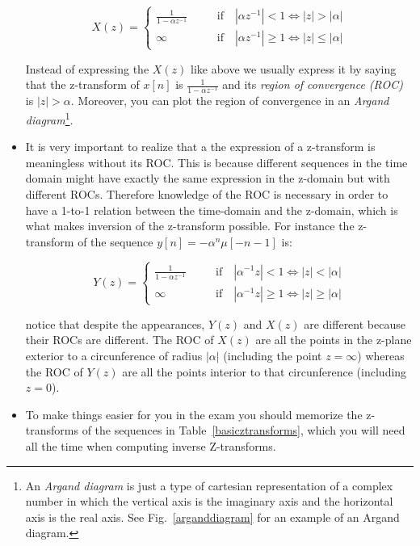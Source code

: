 \documentclass[a4paper,11pt,oneside]{article}
\begin{document}
\begin{itemize}
\begin{equation}
X(z)=\left\{
\begin{array}{lll}
\frac{1}{1-\alpha z^{-1}} &\quad & \textrm{if} \quad |\alpha z^{-1}|<1 \Leftrightarrow |z|> |\alpha|\\
\infty &\quad& \textrm{if} \quad |\alpha z^{-1}|\geq 1  \Leftrightarrow |z|\leq |\alpha|
\end{array}
\right.
\end{equation}

Instead of expressing the $X(z)$ like above we usually express it by saying that the z-transform of $x[n]$ is $\frac{1}{1-\alpha z^{-1}}$ and its \emph{region of convergence (ROC)} is $|z|>\alpha$. Moreover, you can plot the region of convergence in an \emph{Argand diagram}\footnote{An \emph{Argand diagram} is just a type of cartesian representation of a complex number in which the vertical axis is the imaginary axis and the horizontal axis is the real axis. See Fig.~\ref{arganddiagram} for an example of an Argand diagram.}.


\item It is very important to realize that a the expression of a z-transform is meaningless without its ROC. This is because different sequences in the time domain might have exactly the same expression in the z-domain but with different ROCs. Therefore knowledge of the ROC is necessary in order to have a 1-to-1 relation between the time-domain and the z-domain, which is what makes inversion of the z-transform possible. For instance the z-transform of the sequence $y[n]=-\alpha^n\mu[-n-1]$ is:

\begin{equation}
Y(z)=\left\{
\begin{array}{lll}
\frac{1}{1-\alpha z^{-1}} &\quad & \textrm{if} \quad |\alpha^{-1} z|<1 \Leftrightarrow |z|<|\alpha|\\
\infty &\quad& \textrm{if} \quad |\alpha^{-1} z|\geq 1 \Leftrightarrow |z|\geq |\alpha|
\end{array}
\right.
\end{equation}

notice that despite the appearances, $Y(z)$ and $X(z)$ are different because their ROCs are different. The ROC of $X(z)$ are all the points in the z-plane exterior to a circunference of radius $|\alpha|$ (including the point $z=\infty$) whereas the ROC of $Y(z)$ are all the points interior to that circunference (including $z=0$).

\item To make things easier for you in the exam you should memorize the z-transforms of the sequences in Table~\ref{basicztransforms}, which you will need all the time when computing inverse Z-transforms.


\end{itemize}
\end{document}
